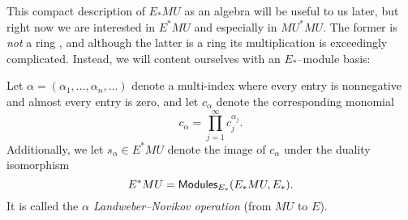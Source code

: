 \noindent This compact description of $E_* MU$ as an algebra will be useful to us later, but right now we are interested in $E^* MU$ and especially in $MU^* MU$.  The former is \emph{not} a ring , and although the latter is a ring its multiplication is exceedingly complicated.  Instead, we will content ourselves with an $E_*$--module basis:
\begin{definition}
Let $\alpha = (\alpha_1, \ldots, \alpha_n, \ldots)$ denote a multi-index where every entry is nonnegative and almost every entry is zero, and let $c_\alpha$ denote the corresponding monomial \[c_\alpha = \prod_{j=1}^\infty c_j^{\alpha_j}.\]  Additionally, we let $s_\alpha \in E^* MU$ denote the image of $c_\alpha$ under the duality isomorphism \[E^* MU = \mathsf{Modules}_{E_*}(E_* MU, E_*).\]  It is called the \textit{$\alpha${\th} Landweber--Novikov operation} (from $MU$ to $E$).
\end{definition}


